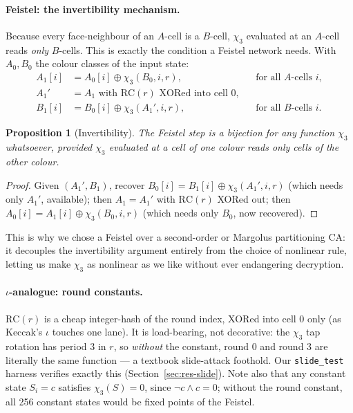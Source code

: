 \documentclass[11pt,a4paper]{article}
\theoremstyle{plain}
\newtheorem{proposition}{Proposition}
\theoremstyle{definition}
\theoremstyle{remark}
\begin{document}
\paragraph{Feistel: the invertibility mechanism.} Because every face-neighbour of an
$A$-cell is a $B$-cell, $\chi_3$ evaluated at an $A$-cell reads \emph{only} $B$-cells.
This is exactly the condition a Feistel network needs. With $A_0, B_0$ the colour
classes of the input state:
\begin{align}
  A_1[i] &= A_0[i] \oplus \chi_3(B_0, i, r), &&\text{for all $A$-cells } i,\\
  A_1'   &= A_1 \text{ with } \mathrm{RC}(r) \text{ XORed into cell } 0, \\
  B_1[i] &= B_0[i] \oplus \chi_3(A_1', i, r), &&\text{for all $B$-cells } i.
\end{align}
\begin{proposition}[Invertibility]
The Feistel step is a bijection for \emph{any} function $\chi_3$ whatsoever, provided
$\chi_3$ evaluated at a cell of one colour reads only cells of the other colour.
\end{proposition}
\begin{proof}
Given $(A_1', B_1)$, recover $B_0[i] = B_1[i] \oplus \chi_3(A_1', i, r)$ (which needs
only $A_1'$, available); then $A_1 = A_1'$ with $\mathrm{RC}(r)$ XORed out; then
$A_0[i] = A_1[i] \oplus \chi_3(B_0, i, r)$ (which needs only $B_0$, now recovered).
\end{proof}
This is why we chose a Feistel over a second-order or Margolus partitioning CA: it
decouples the invertibility argument entirely from the choice of nonlinear rule,
letting us make $\chi_3$ as nonlinear as we like without ever endangering decryption.

\paragraph{$\iota$-analogue: round constants.} $\mathrm{RC}(r)$ is a cheap
integer-hash of the round index, XORed into cell 0 only (as Keccak's $\iota$ touches
one lane). It is load-bearing, not decorative: the $\chi_3$ tap rotation has period 3
in $r$, so \emph{without} the constant, round 0 and round 3 are literally the same
function --- a textbook slide-attack foothold. Our \texttt{slide\_test} harness
verifies exactly this (Section~\ref{sec:res-slide}). Note also that any constant state
$S_i = c$ satisfies $\chi_3(S) = 0$, since $\lnot c \wedge c = 0$; without the round
constant, all 256 constant states would be fixed points of the Feistel.
\end{document}

